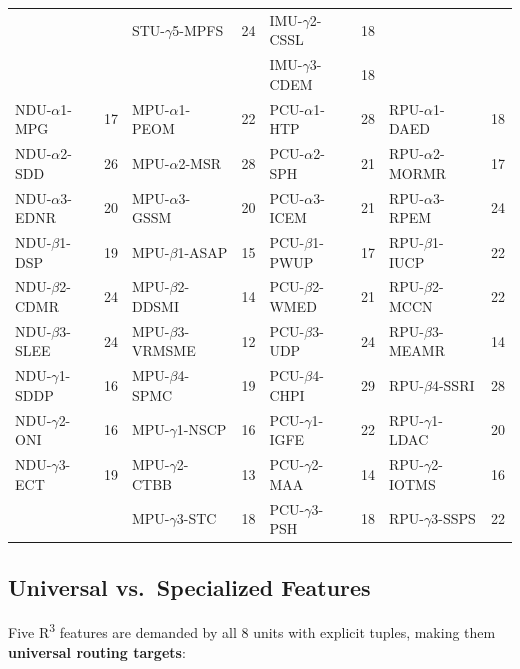\begin{table}[H]
{\begin{tabular}{@{}lr|lr|lr|lr@{}}
                    &    & STU-$\gamma$5-MPFS & 24 & IMU-$\gamma$2-CSSL  & 18 &                    &    \\
                    &    &                    &    & IMU-$\gamma$3-CDEM  & 18 &                    &    \\
\midrule
\rowcolor{grpE!15}
NDU-$\alpha$1-MPG  & 17 & MPU-$\alpha$1-PEOM & 22 & PCU-$\alpha$1-HTP   & 28 & RPU-$\alpha$1-DAED & 18 \\
\rowcolor{grpE!15}
NDU-$\alpha$2-SDD  & 26 & MPU-$\alpha$2-MSR  & 28 & PCU-$\alpha$2-SPH   & 21 & RPU-$\alpha$2-MORMR& 17 \\
\rowcolor{grpE!15}
NDU-$\alpha$3-EDNR & 20 & MPU-$\alpha$3-GSSM & 20 & PCU-$\alpha$3-ICEM  & 21 & RPU-$\alpha$3-RPEM & 24 \\
\rowcolor{grpE!8}
NDU-$\beta$1-DSP   & 19 & MPU-$\beta$1-ASAP  & 15 & PCU-$\beta$1-PWUP   & 17 & RPU-$\beta$1-IUCP  & 22 \\
\rowcolor{grpE!8}
NDU-$\beta$2-CDMR  & 24 & MPU-$\beta$2-DDSMI & 14 & PCU-$\beta$2-WMED   & 21 & RPU-$\beta$2-MCCN  & 22 \\
\rowcolor{grpE!8}
NDU-$\beta$3-SLEE  & 24 & MPU-$\beta$3-VRMSME& 12 & PCU-$\beta$3-UDP    & 24 & RPU-$\beta$3-MEAMR & 14 \\
\rowcolor{grpE!4}
NDU-$\gamma$1-SDDP & 16 & MPU-$\beta$4-SPMC  & 19 & PCU-$\beta$4-CHPI   & 29 & RPU-$\beta$4-SSRI  & 28 \\
\rowcolor{grpE!4}
NDU-$\gamma$2-ONI  & 16 & MPU-$\gamma$1-NSCP & 16 & PCU-$\gamma$1-IGFE  & 22 & RPU-$\gamma$1-LDAC & 20 \\
\rowcolor{grpE!4}
NDU-$\gamma$3-ECT  & 19 & MPU-$\gamma$2-CTBB & 13 & PCU-$\gamma$2-MAA   & 14 & RPU-$\gamma$2-IOTMS& 16 \\
                    &    & MPU-$\gamma$3-STC  & 18 & PCU-$\gamma$3-PSH   & 18 & RPU-$\gamma$3-SSPS & 22 \\
\bottomrule
\end{tabular}
}
\end{table}


\subsection{Universal vs.\ Specialized Features}
\label{subsec:routing-universal}

Five R\textsuperscript{3} features are demanded by all 8 units with
explicit tuples, making them \textbf{universal routing targets}:

